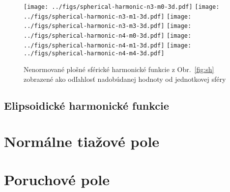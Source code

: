 \documentclass[a4paper, 12pt]{book}
\begin{document}
\begin{figure}[bt]
\centering
\texttt{[image: ../figs/spherical-harmonic-n3-m0-3d.pdf]}
\texttt{[image: ../figs/spherical-harmonic-n3-m1-3d.pdf]}
\texttt{[image: ../figs/spherical-harmonic-n3-m3-3d.pdf]}
\texttt{[image: ../figs/spherical-harmonic-n4-m0-3d.pdf]}
\texttt{[image: ../figs/spherical-harmonic-n4-m1-3d.pdf]}
\texttt{[image: ../figs/spherical-harmonic-n4-m4-3d.pdf]}
\caption{Nenormované plošné sférické harmonické funkcie z Obr.~\ref{fig:sh} 
zobrazené ako odľahlosť nadobúdanej hodnoty od jednotkovej sféry}
\label{fig:sh3d}
\end{figure}






\section{Elipsoidické harmonické funkcie}








\chapter{Normálne tiažové pole}








\chapter{Poruchové pole}

\end{document}

